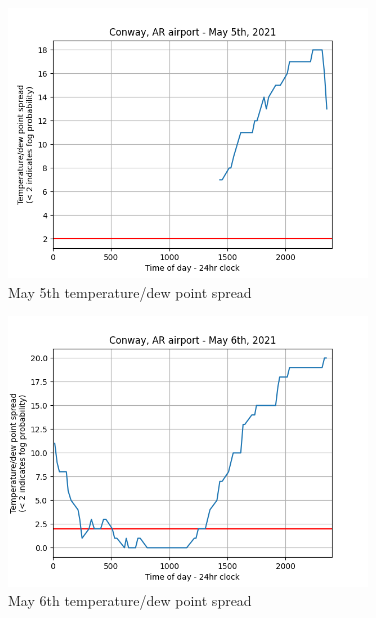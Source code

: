 \documentclass{article}
\begin{document}
\begin{figure}[hb!]
\begin{center}
\includegraphics[width=0.85\textwidth]{May5th.png}
\end{center}
\caption{May 5th temperature/dew point spread}
\label{May 5th}
\end{figure}

\begin{figure}[htp!]
\begin{center}
\includegraphics[width=0.85\textwidth]{May6th.png}
\end{center}
\caption{May 6th temperature/dew point spread}
\label{May 6th}
\end{figure}
\end{document}
